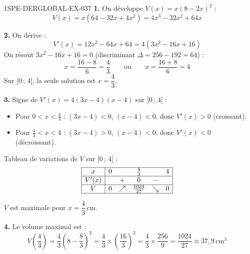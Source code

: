 \begin{corrige}{1SPE-DERGLOBAL-EX-037}
\textbf{1.} On développe $V(x) = x(8 - 2x)^2$ :
\[
V(x) = x(64 - 32x + 4x^2) = 4x^3 - 32x^2 + 64x
\]

\textbf{2.} On dérive :
\[
V'(x) = 12x^2 - 64x + 64 = 4(3x^2 - 16x + 16)
\]
On résout $3x^2 - 16x + 16 = 0$ (discriminant $\Delta = 256 - 192 = 64$) :
\[
x = \frac{16 - 8}{6} = \frac{4}{3} \qquad \text{ou} \qquad x = \frac{16 + 8}{6} = 4
\]
Sur $]0\,;\,4[$, la seule solution est $x = \dfrac{4}{3}$.

\textbf{3.} Signe de $V'(x) = 4(3x - 4)(x - 4)$ sur $]0\,;\,4[$ :
\begin{itemize}
\item Pour $0 < x < \frac{4}{3}$ : $(3x-4) < 0$, $(x-4) < 0$, donc $V'(x) > 0$ (croissant).
\item Pour $\frac{4}{3} < x < 4$ : $(3x-4) > 0$, $(x-4) < 0$, donc $V'(x) < 0$ (décroissant).
\end{itemize}

Tableau de variations de $V$ sur $]0\,;\,4[$ :
\[
\begin{array}{|c|ccccc|}
\hline
x & 0 & & \frac{4}{3} & & 4 \\
\hline
V'(x) & & + & 0 & - & \\
\hline
V & 0 & \nearrow & \frac{1024}{27} & \searrow & 0 \\
\hline
\end{array}
\]

$V$ est maximale pour $x = \dfrac{4}{3}\,\text{cm}$.

\textbf{4.} Le volume maximal est :
\[
V\!\left(\frac{4}{3}\right) = \frac{4}{3}\left(8 - \frac{8}{3}\right)^2 = \frac{4}{3} \times \left(\frac{16}{3}\right)^2 = \frac{4}{3} \times \frac{256}{9} = \boxed{\frac{1024}{27} \approx 37{,}9\,\text{cm}^3}
\]
\end{corrige}
